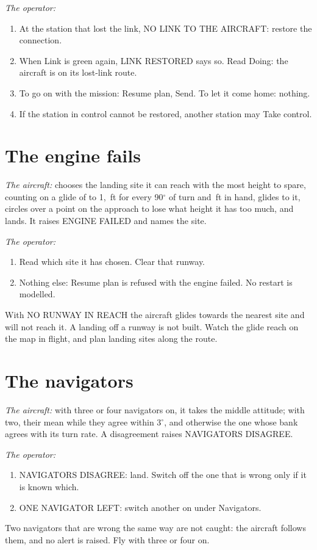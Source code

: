 \documentclass[11pt,a4paper,oneside]{book}
\newcommand{\ann}[1]{\textsf{#1}}
\begin{document}
\emph{The operator:}
\begin{enumerate}
\item At the station that lost the link, \ann{NO LINK TO THE AIRCRAFT}: restore the connection.
\item When \ann{Link} is green again, \ann{LINK RESTORED} says so. Read \ann{Doing}: the aircraft is on its lost-link route.
\item To go on with the mission: \ann{Resume plan}, \ann{Send}. To let it come home: nothing.
\item If the station in control cannot be restored, another station may \ann{Take control}.
\end{enumerate}

\section{The engine fails}
\emph{The aircraft:} chooses the landing site it can reach with the most height to spare, counting on a glide of
\MGlideRatio{} to 1, \MTurnCost\,ft for every 90$^\circ$ of turn and \MInHand\,ft in hand, glides to it, circles over a
point on the approach to lose what height it has too much, and lands. It raises \ann{ENGINE FAILED} and names the site.

\emph{The operator:}
\begin{enumerate}
\item Read which site it has chosen. Clear that runway.
\item Nothing else: \ann{Resume plan} is refused with the engine failed. No restart is modelled.
\end{enumerate}
\begin{warning}
With \ann{NO RUNWAY IN REACH} the aircraft glides towards the nearest site and will not reach it. A landing off a
runway is not built. Watch the glide reach on the map in flight, and plan landing sites along the route.
\end{warning}

\section{The navigators}
\emph{The aircraft:} with three or four navigators on, it takes the middle attitude; with two, their mean while they
agree within 3$^\circ$, and otherwise the one whose bank agrees with its turn rate. A disagreement raises
\ann{NAVIGATORS DISAGREE}.

\emph{The operator:}
\begin{enumerate}
\item \ann{NAVIGATORS DISAGREE}: land. Switch off the one that is wrong only if it is known which.
\item \ann{ONE NAVIGATOR LEFT}: switch another on under \ann{Navigators}.
\end{enumerate}
\begin{warning}
Two navigators that are wrong the same way are not caught: the aircraft follows them, and no alert is raised. Fly
with three or four on.
\end{warning}
\end{document}
